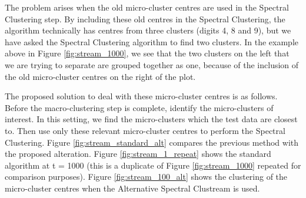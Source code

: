 The problem arises when the old micro-cluster centres are used in the Spectral Clustering step. By including these old centres in the Spectral Clustering, the algorithm technically has centres from three clusters (digits 4, 8 and 9), but we have asked the Spectral Clustering algorithm to find two clusters. In the example above in Figure \ref{fig:stream_1000}, we see that the two clusters on the left that we are trying to separate are grouped together as one, because of the inclusion of the old micro-cluster centres on the right of the plot.

The proposed solution to deal with these micro-cluster centres is as follows. Before the macro-clustering step is complete, identify the micro-clusters of interest. In this setting, we find the micro-clusters which the test data are closest to. Then use only these relevant micro-cluster centres to perform the Spectral Clustering. Figure \ref{fig:stream_standard_alt} compares the  previous method with the proposed alteration. Figure \ref{fig:stream_1_repeat} shows the standard algorithm at t = 1000 (this is a duplicate of Figure \ref{fig:stream_1000} repeated for comparison purposes). Figure \ref{fig:stream_100_alt} shows the clustering of the micro-cluster centres when the  Alternative Spectral Clustream is used. 


